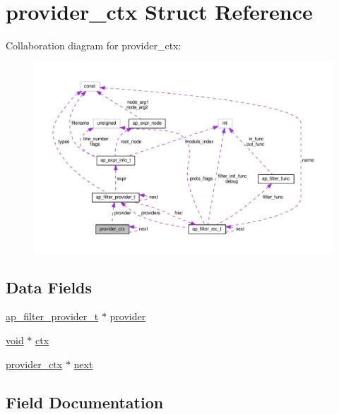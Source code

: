 \hypertarget{structprovider__ctx}{}\section{provider\+\_\+ctx Struct Reference}
\label{structprovider__ctx}


Collaboration diagram for provider\+\_\+ctx\+:
\nopagebreak
\begin{figure}[H]
\begin{center}
\leavevmode
\includegraphics[width=350pt]{structprovider__ctx__coll__graph}
\end{center}
\end{figure}
\subsection*{Data Fields}
\begin{DoxyCompactItemize}
\item 
\hyperlink{structap__filter__provider__t}{ap\+\_\+filter\+\_\+provider\+\_\+t} $\ast$ \hyperlink{structprovider__ctx_a91044cbe8974bf1c82c7ca236c067193}{provider}
\item 
\hyperlink{group__MOD__ISAPI_gacd6cdbf73df3d9eed42fa493d9b621a6}{void} $\ast$ \hyperlink{structprovider__ctx_a50271ced3bbcf8bd2e40b6415bcd520c}{ctx}
\item 
\hyperlink{structprovider__ctx}{provider\+\_\+ctx} $\ast$ \hyperlink{structprovider__ctx_ad1fcbc3f189ce6508e2d7995f65cef10}{next}
\end{DoxyCompactItemize}


\subsection{Field Documentation}
